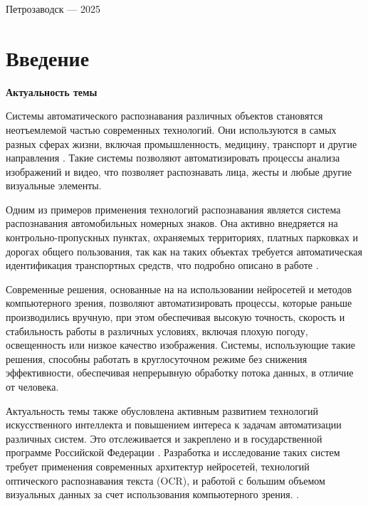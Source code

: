 \documentclass[a4paper,12pt]{article}
\begin{document}
\vfill
\begin{center}
\large
Петрозаводск --- 2025
\end{center}


\newpage

\setcounter{tocdepth}{4}
\tableofcontents


\newpage
\section*{Введение}

\textbf{Актуальность темы}

Системы автоматического распознавания различных объектов становятся неотъемлемой частью современных технологий. Они используются в самых разных сферах жизни, включая промышленность, медицину, транспорт и другие направления \cite{beliy}. Такие системы позволяют автоматизировать процессы анализа изображений и видео, что позволяет распознавать лица, жесты и любые другие визуальные элементы.

Одним из примеров применения технологий распознавания является система распознавания автомобильных номерных знаков. Она активно внедряется на контрольно-пропускных пунктах, охраняемых территориях, платных парковках и дорогах общего пользования, так как на таких объектах требуется автоматическая идентификация транспортных средств, что подробно описано в работе \cite{beliy}.

Современные решения, основанные на на использовании нейросетей и методов компьютерного зрения, позволяют автоматизировать процессы, которые раньше производились вручную, при этом обеспечивая высокую точность, скорость и стабильность работы в различных условиях, включая плохую погоду, освещенность или низкое качество изображения. Системы, использующие такие решения, способны работать в круглосуточном режиме без снижения эффективности, обеспечивая непрерывную обработку потока данных, в отличие от человека.

Актуальность темы также обусловлена активным развитием технологий искусственного интеллекта и повышением интереса к задачам автоматизации различных систем. Это отслеживается и закреплено и в государственной программе Российской Федерации \cite{ukaz-rf}. Разработка и исследование таких систем требует применения современных архитектур нейросетей, технологий оптического распознавания текста (OCR), и работой с большим объемом визуальных данных за счет использования компьютерного зрения. .
\end{document}
